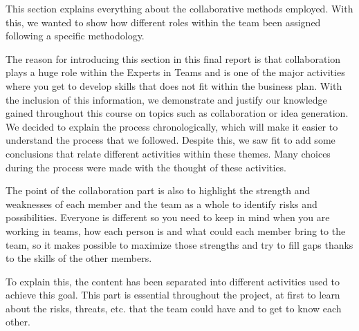 This section explains everything about the collaborative methods employed. 
With this, we wanted to show how different roles within the team been assigned following a specific methodology. 

The reason for introducing this section in this final report is that collaboration plays a huge role within the Experts in Teams and is one of the major activities where you get to develop skills that does not fit within the business plan. 
With the inclusion of this information, we demonstrate and justify our knowledge gained throughout this course on topics such as collaboration or idea generation. 
We decided to explain the process chronologically, which will make it easier to understand the process that we followed. 
Despite this, we saw fit to add some conclusions that relate different activities within these themes. Many choices during the process were made with the thought of these activities. 

The point of the collaboration part is also to highlight the strength and weaknesses of each member and the team as a whole to identify risks and possibilities. 
Everyone is different so you need to keep in mind when you are working in teams, how each person is and what could each member bring to the team, so it makes possible to maximize those strengths and try to fill gaps thanks to the skills of the other members.

To explain this, the content has been separated into different activities used to achieve this goal. 
This part is essential throughout the project, at first to learn about the risks, threats, etc. that the team could have and to get to know each other. 